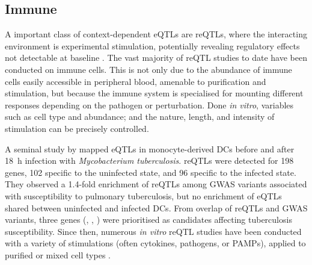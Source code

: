 \begin{outline}
\subsection{Immune }
\label{subsec:intro_reQTL}

A important class of context-dependent \glspl{eQTL} are \glspl{reQTL}, 
where the interacting environment is experimental stimulation,
potentially revealing regulatory effects not detectable at baseline \autocite{vandiedonck2017GeneticAssociationMolecular,huang2019GeneticsGeneExpression}.
The vast majority of \gls{reQTL} studies to date have been conducted on immune cells. 
This is not only due to the abundance of immune cells easily accessible in peripheral blood, amenable to purification and stimulation,
but because the immune system is specialised for mounting different responses depending on the pathogen or perturbation.
Done \textit{in vitro}, variables such as cell type and abundance; and the nature, length, and intensity of stimulation can be precisely controlled.

A seminal study by \textcite{barreiro2012DecipheringGeneticArchitecture} mapped \glspl{eQTL} in monocyte-derived \glspl{DC} before and after \SI{18}{\hour} infection with \textit{Mycobacterium tuberculosis}.
\glspl{reQTL} were detected for 198 genes, 102 specific to the uninfected state, and 96 specific to the infected state. 
They observed a 1.4-fold enrichment of \glspl{reQTL} among \gls{GWAS} variants associated with susceptibility to pulmonary tuberculosis,
but no enrichment of \glspl{eQTL} shared between uninfected and infected \glspl{DC}.
From overlap of \glspl{reQTL} and \gls{GWAS} variants,
three genes (, , ) were prioritised as candidates affecting tuberculosis susceptibility.
Since then, numerous \textit{in vitro} \gls{reQTL} studies have been conducted with a variety of stimulations (often cytokines, pathogens, or \glspl{PAMP}),
applied to purified \autocite{fairfax2014InnateImmuneActivity,kim2014CharacterizingGeneticBasis,hu2014RegulationGeneExpression,lee2014CommonGeneticVariants,caliskan2015HostGeneticVariation,quach2016GeneticAdaptationNeandertal,kim-hellmuth2017GeneticRegulatoryEffects,alasoo2018SharedGeneticEffects,gate2018GeneticDeterminantsCoaccessible,schmiedel2018ImpactGeneticPolymorphisms,alasoo2019GeneticEffectsPromoter,calderon2019LandscapeStimulationresponsiveChromatin,devries2020IntegratingGWASBulk,huang2020NeonatalGeneticsGene}
or mixed cell types \autocite{caliskan2015HostGeneticVariation,manry2017DecipheringGeneticControl}.


\end{outline}
